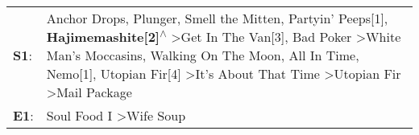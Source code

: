 \begin{supertabular}{p{0.03\textwidth}p{0.92\textwidth}}
 \textbf{S1}:  &  Anchor Drops\textsuperscript{}, \enspace Plunger\textsuperscript{}, \enspace Smell the Mitten\textsuperscript{}, \enspace Partyin' Peeps[1]\textsuperscript{}, \enspace \textbf{Hajimemashite[2]\textsuperscript{$\wedge$}} \textgreater \enspace Get In The Van[3]\textsuperscript{}, \enspace Bad Poker\textsuperscript{} \textgreater \enspace White Man's Moccasins\textsuperscript{}, \enspace Walking On The Moon\textsuperscript{}, \enspace All In Time\textsuperscript{}, \enspace Nemo[1]\textsuperscript{}, \enspace Utopian Fir[4]\textsuperscript{} \textgreater \enspace It's About That Time\textsuperscript{} \textgreater \enspace Utopian Fir\textsuperscript{} \textgreater \enspace Mail Package\textsuperscript{}  \enspace  \\
 \textbf{E1}:  &                                                                                                                                                                                                                                                                                                                                                                                                                                                                                                                                                                                                                                                         Soul Food I\textsuperscript{} \textgreater \enspace Wife Soup\textsuperscript{}  \enspace  \\
\end{supertabular}
